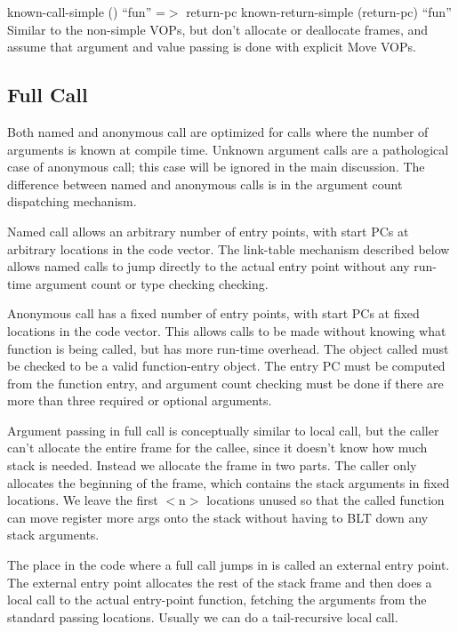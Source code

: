 {\begin{itemize, spread 0, spacing 1}
known-call-simple () ``fun'' =$>$ return-pc
known-return-simple (return-pc) ``fun''
    Similar to the non-simple VOPs, but don't allocate or deallocate frames,
    and assume that argument and value passing is done with explicit Move VOPs.

\subsection{Full Call}

Both named and anonymous call are optimized for calls where the number of
arguments is known at compile time.  Unknown argument calls are a
pathological case of anonymous call; this case will be ignored in the main
discussion.  The difference between named and anonymous calls is in the
argument count dispatching mechanism.

Named call allows an arbitrary number of entry points, with start PCs at
arbitrary locations in the code vector.  The link-table mechanism described
below allows named calls to jump directly to the actual entry point without any
run-time argument count or type checking checking.

Anonymous call has a fixed number of entry points, with start PCs at fixed
locations in the code vector.  This allows calls to be made without knowing
what function is being called, but has more run-time overhead.  The object
called must be checked to be a valid function-entry object.  The entry PC must
be computed from the function entry, and argument count checking must be done
if there are more than three required or optional arguments.

Argument passing in full call is conceptually similar to local call, but the
caller can't allocate the entire frame for the callee, since it doesn't know
how much stack is needed.  Instead we allocate the frame in two parts.  The
caller only allocates the beginning of the frame, which contains the stack
arguments in fixed locations.  We leave the first $<$n$>$ locations unused so that
the called function can move register more args onto the stack without having
to BLT down any stack arguments.

The place in the code where a full call jumps in is called an external entry
point.  The external entry point allocates the rest of the stack frame and then
does a local call to the actual entry-point function, fetching the arguments
from the standard passing locations.  Usually we can do a tail-recursive local
call.  


\end{itemize, spread 0, spacing 1}}
